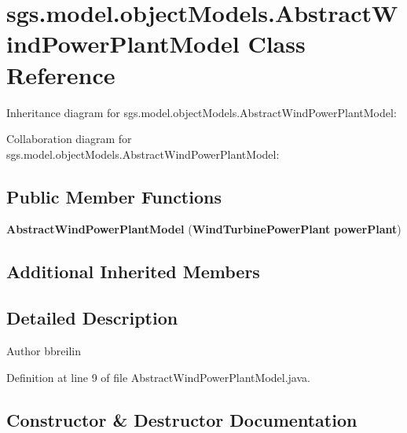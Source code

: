 \section{sgs.\-model.\-object\-Models.\-Abstract\-Wind\-Power\-Plant\-Model Class Reference}
\label{classsgs_1_1model_1_1object_models_1_1_abstract_wind_power_plant_model}


Inheritance diagram for sgs.\-model.\-object\-Models.\-Abstract\-Wind\-Power\-Plant\-Model\-:


Collaboration diagram for sgs.\-model.\-object\-Models.\-Abstract\-Wind\-Power\-Plant\-Model\-:
\subsection*{Public Member Functions}
\begin{DoxyCompactItemize}
\item 
{\bf Abstract\-Wind\-Power\-Plant\-Model} ({\bf Wind\-Turbine\-Power\-Plant} {\bf power\-Plant})
\end{DoxyCompactItemize}
\subsection*{Additional Inherited Members}


\subsection{Detailed Description}
\begin{DoxyAuthor}{Author}
bbreilin 
\end{DoxyAuthor}


Definition at line 9 of file Abstract\-Wind\-Power\-Plant\-Model.\-java.



\subsection{Constructor \& Destructor Documentation}
